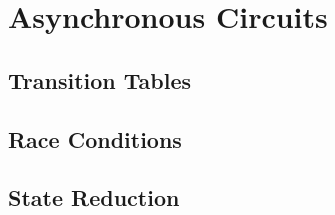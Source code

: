 \chapter{Asynchronous Circuits}
\label{c-Async}

\section{Transition Tables}



\section{Race Conditions}


\section{State Reduction}

